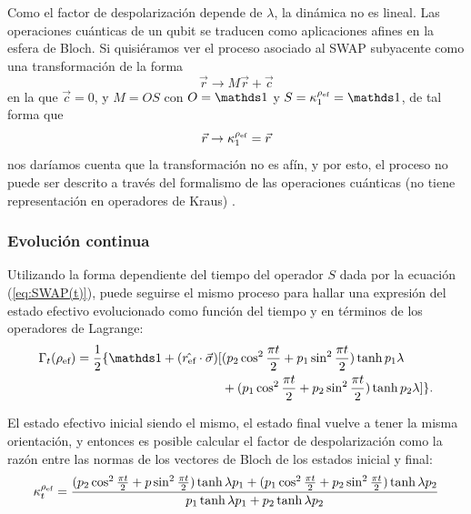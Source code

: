 Como el factor de despolarización depende de $\lambda$, la dinámica no es lineal. Las operaciones cuánticas de un qubit se traducen como aplicaciones afines en la esfera de Bloch. Si quisiéramos ver el proceso asociado al \textsc{SWAP} subyacente como una transformación de la forma
\begin{equation*}
  \vec{r}\rightarrow M\vec{r}+\vec{c}
\end{equation*}
en la que $\vec{c}=0$, y $M=OS$ con $O=\Id$ y $S=\kappa_{1}^{\rho_{\ef}}=\Id$, de tal forma que
\begin{equation*}
  \vec{r}\rightarrow \kappa_{1}^{\rho_{\text{ef}}}=\vec{r}
\end{equation*}
nos daríamos cuenta que la transformación no es afín, y por esto, el proceso no puede ser descrito a través del formalismo de las operaciones cuánticas (no tiene representación en operadores de Kraus) \cite{Chuang}.

\subsubsection{Evolución continua}

Utilizando la forma dependiente del tiempo del operador $S$ dada por la ecuación (\ref{eq:SWAP(t)}), puede seguirse el mismo proceso para hallar una expresión del estado efectivo evolucionado como función del tiempo y en términos de los operadores de Lagrange:
\begin{align}
  \begin{split}
  \Gamma_{t}(\rho_{\ef})=\frac{1}{2}\{\Id+(\hat{r_{\ef}}\cdot\vec{\sigma})[&(p_{2}\cos^{2}{\frac{\pi t}{2}}+p_{1}\sin^{2}{\frac{\pi t}{2}})\tanh{p_{1}\lambda}\\
  &+(p_{1}\cos^{2}{\frac{\pi t}{2}}+p_{2}\sin^{2}{\frac{\pi t}{2}})\tanh{p_{2}\lambda}]\}.
  \end{split}
\end{align}

El estado efectivo inicial siendo el mismo, el estado final vuelve a tener la misma orientación, y entonces es posible calcular el factor de despolarización como la razón entre las normas de los vectores de Bloch de los estados inicial y final:
\begin{equation}\label{eq:SWAPFactort}
  \kappa_{t}^{\rho_{\text{ef}}}=\frac{(p_{2}\cos^{2}{\frac{\pi t}{2}}+p\sin^{2}{\frac{\pi t}{2}})\tanh{\lambda p_{1}}+(p_{1}\cos^{2}{\frac{\pi t}{2}}+p_{2}\sin^{2}{\frac{\pi t}{2}})\tanh{\lambda p_{2}}}{
    p_{1}\tanh{\lambda p_{1}}+p_{2}\tanh{\lambda p_{2}}}
\end{equation}

